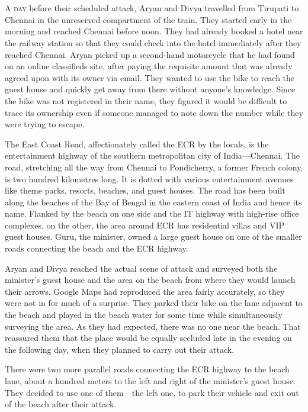 \chapter{}

\lettrine{A}{ day} before their scheduled attack, Aryan and Divya travelled
from Tirupati to Chennai in the unreserved compartment of the train. They
started early in the morning and reached Chennai before noon. They had already
booked a hotel near the railway station so that they could check into the hotel 
immediately after they reached Chennai. Aryan picked up a second-hand motorcycle
that he had found on an online classifieds site, after paying the requisite amount
that was already agreed upon with its owner via email. They wanted to use the bike to
reach the guest house and quickly get away from there without anyone's
knowledge. Since the bike was not registered in their name, they figured it would
be difficult to trace its ownership even if someone managed to note down the
number while they were trying to escape.

The East Coast Road, affectionately called the ECR by the locals, is the
entertainment highway of the southern metropolitan city of India—Chennai. The
road, stretching all the way from Chennai to Pondicherry, a former French colony,
is two hundred kilometres long. It is dotted with various entertainment avenues
like theme parks, resorts, beaches, and guest houses. The road has been built
along the beaches of the Bay of Bengal in the eastern coast of India and hence
its name. Flanked by the beach on one side and the IT highway with high-rise
office complexes, on the other, the area around ECR has residential villas and
VIP guest houses.  Guru, the minister, owned a large guest house on one of the
smaller roads connecting the beach and the ECR highway.

Aryan and Divya reached the actual scene of attack and surveyed both the
minister's guest house and the area on the beach from where they would launch
their arrows. Google Maps had reproduced the area fairly accurately, so
they were not in for much of a surprise. They parked their bike on the lane
adjacent to the beach and played in the beach water for some time while
simultaneously surveying the area. As they had expected, there was no one near
the beach. That reassured them that the place would be equally secluded late in the
evening on the following day, when they planned to carry out their attack.

There were two more parallel roads connecting the ECR highway to the beach lane,
about a hundred meters to the left and right of the minister's guest house. They
decided to use one of them—the left one, to park their vehicle and exit out of
the beach after their attack.

